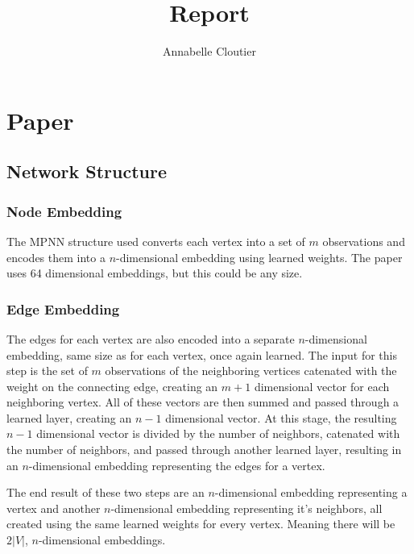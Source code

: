 \documentclass{article}
\title{Report}
\author{Annabelle Cloutier}
\begin{document}
\maketitle

\section{Paper}

\subsection{Network Structure}

\subsubsection{Node Embedding}

The MPNN structure used converts each vertex into a set of $m$ observations and encodes them into a $n$-dimensional embedding using learned weights. The paper uses 64 dimensional embeddings, but this could be any size. 

\subsubsection{Edge Embedding}

The edges for each vertex are also encoded into a separate $n$-dimensional embedding, same size as for each vertex, once again learned. The input for this step is the set of $m$ observations of the neighboring vertices catenated with the weight on the connecting edge, creating an $m + 1$ dimensional vector for each neighboring vertex. All of these vectors are then summed and passed through a learned layer, creating an $n - 1$ dimensional vector. At this stage, the resulting $n - 1$ dimensional vector is divided by the number of neighbors, catenated with the number of neighbors, and passed through another learned layer, resulting in an $n$-dimensional embedding representing the edges for a vertex.

The end result of these two steps are an $n$-dimensional embedding representing a vertex and another $n$-dimensional embedding representing it's neighbors, all created using the same learned weights for every vertex. Meaning there will be $2|V|$, $n$-dimensional embeddings. 

\subsubsection{}
\end{document}
